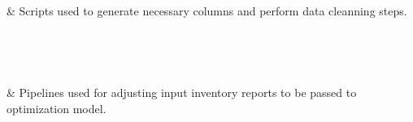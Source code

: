 \documentclass[letterpaper,10pt,english]{sphinxmanual}
\begin{document}
\begin{savenotes}\sphinxatlongtablestart\begin{longtable}[c]{}
\hline

\endfirsthead

%
{}\\
\hline

\endhead

\hline
{}\\
\endfoot

\endlastfoot

{\hyperref[\detokenize{source/optimization.datatools:module-optimization.datatools}]{}}
&
Scripts used to generate necessary columns and perform data cleanning steps.
\\
\hline
\end{longtable}\sphinxatlongtableend\end{savenotes}


\begin{savenotes}\sphinxatlongtablestart\begin{longtable}[c]{}
\hline

\endfirsthead

%
{}\\
\hline

\endhead

\hline
{}\\
\endfoot

\endlastfoot

{\hyperref[\detokenize{source/optimization.datatools:module-optimization.datatools.pipelines}]{}}
&
Pipelines used for adjusting input inventory reports to be passed to optimization model.
\\
\hline
\end{longtable}\sphinxatlongtableend\end{savenotes}
\end{document}
